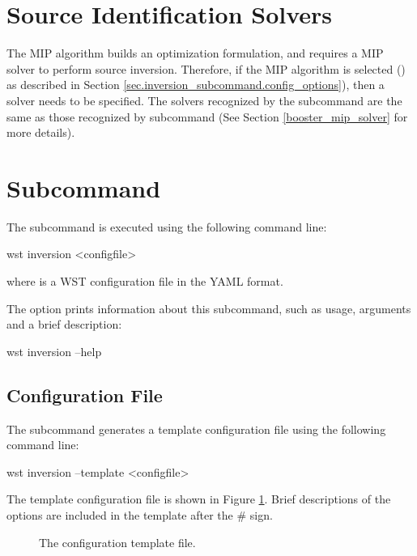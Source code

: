 \section{Source Identification Solvers}

The MIP algorithm builds an optimization formulation, and requires a MIP 
solver to perform source inversion. Therefore, if the MIP algorithm is selected 
() as described in Section 
\ref{sec.inversion_subcommand.config_options}), then a solver needs to be 
specified. The solvers recognized by the  subcommand are 
the same as those recognized by  subcommand (See 
Section \ref{booster_mip_solver} for more details).

\section{ Subcommand}\label{sec.inversion_subcommand}

The  subcommand is executed using the following
command line:
\begin{unknownListing}
wst inversion <configfile>
\end{unknownListing}
where  is a WST configuration file in the YAML format.

The  option prints information about this subcommand,
such as usage, arguments and a brief description:
\begin{unknownListing}
wst inversion --help
\end{unknownListing}

\subsection{Configuration File}

The  subcommand generates a template configuration
file using the following command line:

\begin{unknownListing}
wst inversion --template <configfile>
\end{unknownListing}

The  template configuration file is shown in
Figure \ref{fig:inversion_template}. Brief descriptions of the
options are included in the template after the \# sign.

\begin{figure}[!ht]
  \caption{The  configuration template file.}
  \label{fig:inversion_template}
\end{figure}

